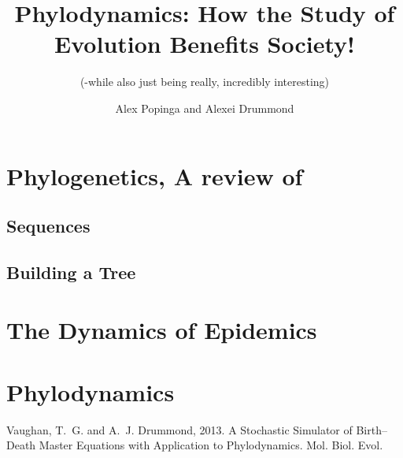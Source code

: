 \documentclass{scrartcl}
\begin{document}
\title{Phylodynamics:  How the Study of Evolution Benefits Society!}

\subtitle{(-while also just being really, incredibly interesting)}
\author{Alex Popinga and Alexei Drummond}
\date{}
\maketitle

\section{Phylogenetics, A review of}




\subsection{Sequences}

\subsection{Building a Tree}



\section{The Dynamics of Epidemics}

\section{Phylodynamics}





\newpage
\begin{thebibliography}{99} %

{\sc Vaughan, T.~G.} and {\sc A.~J. Drummond}, 2013.
A Stochastic Simulator of Birth–Death Master Equations with Application to Phylodynamics.
\newblock Mol. Biol. Evol.
 
\end{thebibliography}

\end{document}
